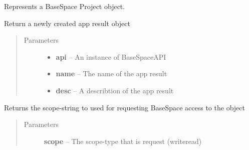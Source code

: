 \documentclass[letterpaper,10pt,english]{sphinxmanual}
\begin{document}
\begin{fulllineitems}
\label{Available modules:BaseSpacePy.model.Project.Project}
Represents a BaseSpace Project object.

\begin{fulllineitems}
\label{Available modules:BaseSpacePy.model.Project.Project.createAppResult}
Return a newly created app result object
\begin{quote}\begin{description}
\item[{Parameters}] \leavevmode\begin{itemize}
\item {} 
\textbf{api} -- An instance of BaseSpaceAPI

\item {} 
\textbf{name} -- The name of the app result

\item {} 
\textbf{desc} -- A describtion of the app result

\end{itemize}

\end{description}\end{quote}

\end{fulllineitems}


\begin{fulllineitems}
\label{Available modules:BaseSpacePy.model.Project.Project.getAccessStr}
Returns the scope-string to used for requesting BaseSpace access to the object
\begin{quote}\begin{description}
\item[{Parameters}] \leavevmode
\textbf{scope} -- The scope-type that is request (write\textbar{}read)

\end{description}\end{quote}

\end{fulllineitems}


\end{fulllineitems}
\end{document}
